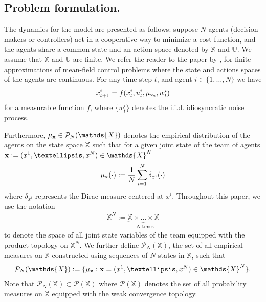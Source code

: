 \documentclass[twoside,11pt]{article}
\def\P{{\mathcal P}}
\begin{document}
\subsection{Problem formulation.}

The dynamics for the model are presented as follows: suppose $N$ agents (decision-makers or controllers) act in a cooperative way to minimize a cost function, and the agents share a common state and an action space denoted by $\mathds{X}$ and $\mathds{U}$.  We assume that $\mathds{X}$ and $\mathds{U}$ are finite. We refer the reader to the paper by \cite{bayraktar2023finite}, for finite approximations of mean-field control problems where the state and actions spaces of the agents are continuous. For any time step $t$, and agent $i\in\{1,\dots,N\}$ we have
\begin{align}\label{dynamics}
x^i_{t+1}=f(x_t^i,u_t^i,\mu_{\bf x_t},w_t^i)
\end{align}
for a measurable function $f$, where $\{w_t^i\}$ denotes the i.i.d. idiosyncratic noise process. 



 Furthermore, $\mu_{\bf x}\in\mathcal{P}_N(\mathds{X})$ denotes the empirical distribution of the agents on the state space $\mathds{X}$ such that for a given joint state of the team of agents ${\bf x}:=(x^1,\dots,x^N)\in \mathds{X}^N$
\begin{align*}
\mu_{\bf x}(\cdot):=\frac{1}{N}\sum_{i=1}^N\delta_{x^i}(\cdot)
\end{align*}
where $\delta_{x^i}$ represents the Dirac measure centered at $x^i$.
Throughout this paper, we use the notation
\begin{align*}
\mathds{X}^N:=\underbrace{\mathds{X}\times\dots\times\mathds{X}}_{\text{ $N$ times}}
\end{align*}
to denote the space of all joint state variables of the team
equipped with the product topology on $\mathds{X}^N$.
We further define $\mathcal{P}_N(\mathds{X})$, the set of all  empirical measures on $\mathds{X}$ constructed using sequences of $N$ states in $\mathds{X}$, such that
\begin{align*}
\mathcal{P}_N(\mathds{X}):=\{\mu_{\bf x}: {\bf x}=(x^1,\dots,x^N)\in\mathds{X}^N\}.
\end{align*}
Note that $\mathcal{P}_N(\mathds{X})\subset \P(\mathds{X})$ where $\P(\mathds{X})$ denotes the set of all probability measures on $\mathds{X}$ equipped with the weak convergence topology.
\end{document}
